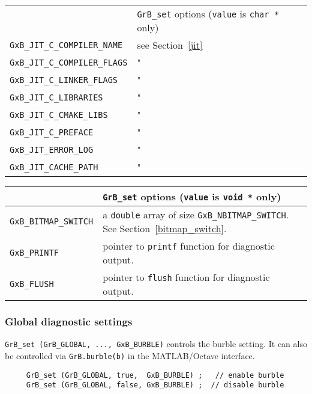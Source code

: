 \noindent
{\small
\begin{tabular}{p{2.2in}p{3.5in}}
\hline
                                    & \verb'GrB_set' options (\verb'value' is \verb'char *' only) \\
\verb'GxB_JIT_C_COMPILER_NAME'      & see Section~\ref{jit} \\
\verb'GxB_JIT_C_COMPILER_FLAGS'     & " \\
\verb'GxB_JIT_C_LINKER_FLAGS'       & " \\
\verb'GxB_JIT_C_LIBRARIES'          & " \\
\verb'GxB_JIT_C_CMAKE_LIBS'         & " \\
\verb'GxB_JIT_C_PREFACE'            & " \\
\verb'GxB_JIT_ERROR_LOG'            & " \\
\verb'GxB_JIT_CACHE_PATH'           & " \\
\hline
\end{tabular}
}

\noindent
{\small
\begin{tabular}{p{2.2in}p{3.5in}}
\hline
                                    & \verb'GrB_set' options (\verb'value' is \verb'void *' only) \\
\hline
\verb'GxB_BITMAP_SWITCH'            & a \verb'double' array of size \verb'GxB_NBITMAP_SWITCH'.
                                        See Section~\ref{bitmap_switch}. \\
\verb'GxB_PRINTF'                   & pointer to \verb'printf' function for diagnostic output. \\
\verb'GxB_FLUSH'                    & pointer to \verb'flush' function for diagnostic output. \\
\hline
\end{tabular}
}


\subsubsection{Global diagnostic settings}

\verb'GrB_set (GrB_GLOBAL, ..., GxB_BURBLE)' controls the burble setting.  It can also be
controlled via \verb'GrB.burble(b)' in the MATLAB/Octave interface.

{\footnotesize
\begin{verbatim}
     GrB_set (GrB_GLOBAL, true,  GxB_BURBLE) ;   // enable burble
     GrB_set (GrB_GLOBAL, false, GxB_BURBLE) ;  // disable burble \end{verbatim}}

